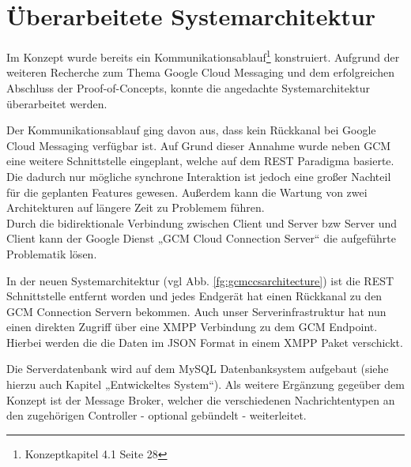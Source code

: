 
\section{Überarbeitete Systemarchitektur}

Im Konzept wurde bereits ein Kommunikationsablauf\footnote{Konzeptkapitel 4.1 Seite 28} konstruiert. Aufgrund der weiteren Recherche zum Thema Google Cloud Messaging und dem erfolgreichen Abschluss der Proof-of-Concepts, konnte die angedachte Systemarchitektur überarbeitet werden.

Der Kommunikationsablauf ging davon aus, dass kein Rückkanal bei Google Cloud Messaging verfügbar ist. Auf Grund dieser Annahme wurde neben GCM eine weitere Schnittstelle eingeplant, welche auf dem REST Paradigma basierte. Die dadurch nur mögliche synchrone Interaktion ist jedoch eine großer Nachteil für die geplanten Features gewesen. Außerdem kann die Wartung von zwei Architekturen auf längere Zeit zu Problemem führen.\\

Durch die bidirektionale Verbindung zwischen Client und Server bzw Server und Client kann der Google Dienst „GCM Cloud Connection Server“ die aufgeführte Problematik lösen.

In der neuen Systemarchitektur (vgl Abb. \ref{fg:gcmccsarchitecture}) ist die REST Schnittstelle entfernt worden und jedes Endgerät hat einen Rückkanal zu den GCM Connection Servern bekommen. Auch unser Serverinfrastruktur hat nun einen direkten Zugriff über eine XMPP Verbindung zu dem GCM Endpoint. Hierbei werden die die Daten im JSON Format in einem XMPP Paket verschickt.

Die Serverdatenbank wird auf dem MySQL Datenbanksystem aufgebaut (siehe hierzu auch Kapitel „Entwickeltes System“). Als weitere Ergänzung gegeüber dem Konzept ist der Message Broker, welcher die verschiedenen Nachrichtentypen an den zugehörigen Controller - optional gebündelt - weiterleitet.

